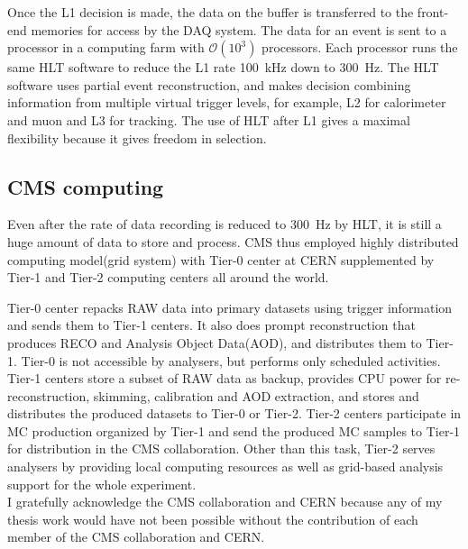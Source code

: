 Once the L1 decision is made, %
the data on the buffer is transferred to the front-end memories for access 
by the DAQ system. The data for an event is sent to a processor 
in a computing farm with $\mathcal{O}(10^3)$ processors. 
Each processor runs the same HLT software to reduce the L1 rate 100~kHz 
down to 300~Hz. The HLT software uses partial event reconstruction, 
and makes decision combining information from multiple virtual trigger 
levels, for example, L2 for calorimeter and muon and L3 for tracking. 
The use of HLT after L1 gives a maximal flexibility because 
it gives freedom in selection. 



\subsection{CMS computing}  

Even after the rate of data recording is reduced to 300~Hz by HLT, 
it is still a huge amount of data to store and process. CMS thus employed 
highly distributed computing model(grid system) with Tier-0 center at CERN supplemented 
by Tier-1 and Tier-2 computing centers all around the world. 

Tier-0 center repacks RAW data into primary datasets using trigger information
and sends them to Tier-1 centers. It also does prompt reconstruction 
that produces RECO and Analysis Object Data(AOD),
and distributes them to Tier-1. Tier-0 is not accessible by analysers, but  
performs only scheduled activities. 
Tier-1 centers store a subset of RAW data as backup, provides CPU power for 
re-reconstruction, skimming, calibration and AOD extraction, and 
stores and distributes the produced datasets to Tier-0 or Tier-2. 
Tier-2 centers participate in MC production organized by Tier-1 and 
send the produced MC samples to Tier-1 for distribution in the CMS collaboration. 
Other than this task, Tier-2 serves analysers by providing local computing 
resources as well as grid-based analysis support for the whole experiment. 
\\

I gratefully acknowledge the CMS collaboration and CERN because 
any of my thesis work would have not been possible without the
contribution of each member of the CMS collaboration and CERN.  
